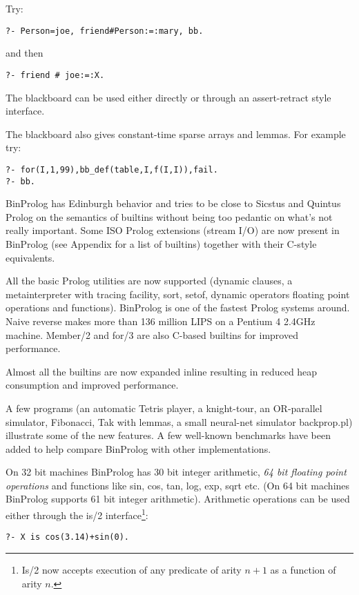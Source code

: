 \documentclass{article}
\begin{document}
Try:

\begin{verbatim}
?- Person=joe, friend#Person:=:mary, bb.
\end{verbatim}

and then
\begin{verbatim}
?- friend # joe:=:X.
\end{verbatim}

The blackboard can be used either directly or
through an assert-retract style interface.

The blackboard also gives constant-time sparse arrays and lemmas.
For example try:

\begin{verbatim}
?- for(I,1,99),bb_def(table,I,f(I,I)),fail.
?- bb.
\end{verbatim}

BinProlog  has Edinburgh behavior and tries to be close
to Sicstus and Quintus Prolog on the semantics of builtins
without being too pedantic on what's not really important.
Some ISO Prolog extensions (stream I/O) are now present
in BinProlog (see Appendix for a list of builtins) together
with their C-style equivalents.

All the basic Prolog utilities are now supported (dynamic clauses, a
metainterpreter with tracing facility, sort, setof, dynamic operators
floating point operations and functions).
BinProlog is one of the fastest Prolog systems around.
Naive reverse makes more than 136 million LIPS on a
Pentium 4 2.4GHz machine.
Member/2 and for/3 are also C-based builtins for improved performance.

Almost all the builtins are now expanded inline resulting in reduced
heap consumption and improved  performance.

A few programs (an automatic Tetris player, a knight-tour, an
OR-parallel simulator, Fibonacci, Tak with lemmas, a small neural-net
simulator backprop.pl) illustrate some of the new features. A few well-known
benchmarks have been added to help compare BinProlog with other
implementations.

On 32 bit machines BinProlog has 30 bit integer arithmetic,
{\em 64 bit floating point operations} and functions like
sin, cos, tan, log, exp, sqrt etc. (On 64 bit machines BinProlog supports 61 bit integer arithmetic).
Arithmetic operations can be used either through the is/2 interface\footnote{Is/2 now
accepts execution of any predicate of arity $n+1$ as a function
of arity $n$.}:

\begin{verbatim}
?- X is cos(3.14)+sin(0).
\end{verbatim}
\end{document}
